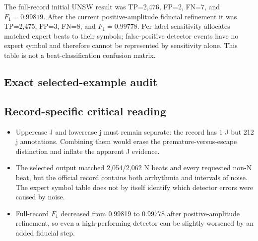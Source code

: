 \documentclass[11pt]{article}
\begin{document}
        The full-record initial UNSW result was TP=2,476, FP=2,
        FN=7, and $F_1=0.99819$. After the current positive-amplitude
        fiducial refinement it was TP=2,475, FP=3,
        FN=8, and $F_1=0.99778$. Per-label sensitivity allocates
        matched expert beats to their symbols; false-positive detector events have no expert symbol and therefore
        cannot be represented by sensitivity alone. This table is not a beat-classification confusion matrix.

        \subsection{Exact selected-example audit}
        \begin{table}[H]
        \centering
        \caption{Timing results for the deterministic displayed examples. Errors are detector minus expert.}
        \end{table}

        \subsection{Record-specific critical reading}
        \begin{itemize}
        \item Uppercase J and lowercase j must remain separate: the record has 1 J but 212 j annotations. Combining them would erase the premature-versus-escape distinction and inflate the apparent J evidence.
\item The selected output matched 2,054/2,062 N beats and every requested non-N beat, but the official record contains both arrhythmia and intervals of noise. The expert symbol table does not by itself identify which detector errors were caused by noise.
\item Full-record $F_1$ decreased from 0.99819 to 0.99778 after positive-amplitude refinement, so even a high-performing detector can be slightly worsened by an added fiducial step.
        \end{itemize}
\end{document}

